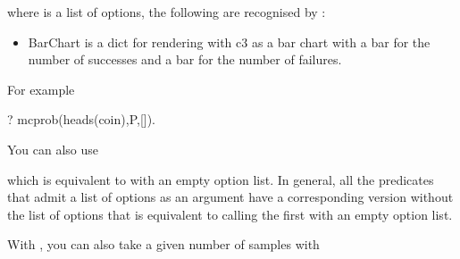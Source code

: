 \documentclass[letterpaper,10pt,english]{sphinxmanual}
\begin{document}
\begin{sphinxVerbatim}[commandchars=\\\{\}]
  
\end{sphinxVerbatim}

where  is a list of options, the following are recognised by :
\begin{itemize}
\item {} 
 BarChart is a dict for rendering with c3 as a bar chart with a bar for the number of successes and a bar for the number of failures.

\end{itemize}

For example

\begin{sphinxVerbatim}[commandchars=\\\{\}]
?\PYGZhy{} mc\PYGZus{}prob(heads(coin),P,[]).
\end{sphinxVerbatim}

You can also use

\begin{sphinxVerbatim}[commandchars=\\\{\}]
  
\end{sphinxVerbatim}

which is equivalent to  with an empty option list.
In general, all the predicates that admit a list of options as an argument have a corresponding version without the list of options that is equivalent to calling the first with an empty option list.

With , you can also take a given number of samples with

\begin{sphinxVerbatim}[commandchars=\\\{\}]
   
\end{sphinxVerbatim}
\end{document}
